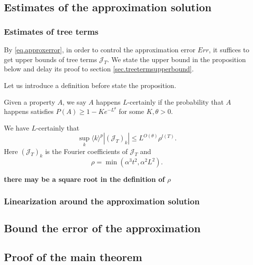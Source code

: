\subsection{Estimates of the approximation solution}

\subsubsection{Estimates of tree terms} By \eqref{eq.approxerror}, in order to control the approximation error $Err$, it suffices to get upper bounds of tree terms $\mathcal{J}_T$. We state the upper bound in the proposition below and delay its proof to section \ref{sec.treetermsupperbound}.

Let us introduce a definition before state the proposition.

\begin{defn}
Given a property $A$, we say $A$ happens $L$-certainly if the probability that $A$ happens satisfies $P(A)\ge 1-Ke^{-L^\theta}$ for some $K, \theta>0$.
\end{defn}

\begin{prop}\label{prop.treetermsupperbound}
We have $L$-certainly that 
\begin{equation}
    \sup_k \langle k\rangle^p |(\mathcal{J}_T)_k|\le L^{O(\theta)} \rho^{l(T)}.
\end{equation}
Here $(\mathcal{J}_T)_k$ is the Fourier coefficients of $\mathcal{J}_T$ and 
\begin{equation}
    \rho=\min(\alpha^3t^2,\alpha^2L^2).
\end{equation}

\textbf{there may be a square root in the definition of $\rho$}
\end{prop}

\subsubsection{Linearization around the approximation solution}

\begin{prop}\label{prop.operatorupperbound}

\end{prop}

\subsection{Bound the error of the approximation}\label{sec.errorw}

\subsection{Proof of the main theorem}\label{sec.proofmain} 

